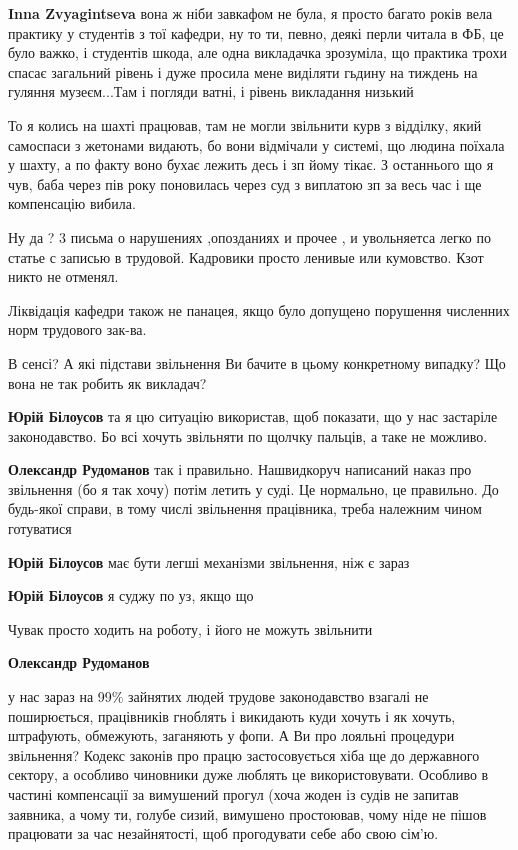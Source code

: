 \begin{itemize}
\begin{itemize} %
\textbf{Inna Zvyagintseva} вона ж ніби завкафом не була, я просто багато років вела практику у студентів з тої кафедри, ну то ти, певно, деякі перли читала в ФБ, це було важко, і студентів шкода, але одна викладачка зрозуміла, що практика трохи спасає загальний рівень і дуже просила мене виділяти гьдину на тиждень на гуляння музеєм...Там і погляди ватні, і рівень викладання низький
\end{itemize} %

То я колись на шахті працював, там не могли звільнити курв з відділку, який самоспаси з жетонами видають, бо вони відмічали у системі, що людина поїхала у шахту, а по факту воно бухає лежить десь і зп йому тікає.
З останнього що я чув, баба через пів року поновилась через суд з виплатою зп за весь час і ще компенсацію вибила.

Ну да ? 3 письма о нарушениях ,опозданиях и прочее , и увольняетса легко по статье с записью в трудовой. Кадровики просто ленивые или кумовство. Кзот никто не отменял.

Ліквідація кафедри також не панацея, якщо було допущено порушення численних норм трудового зак-ва.

В сенсі? А які підстави звільнення Ви бачите в цьому конкретному випадку? Що вона не так робить як викладач?

\begin{itemize} %
\textbf{Юрій Білоусов} та я цю ситуацію використав, щоб показати, що у нас застаріле законодавство. Бо всі хочуть звільняти по щолчку пальців, а таке не можливо.

\textbf{Олександр Рудоманов} так і правильно. Нашвидкоруч написаний наказ про звільнення (бо я так хочу) потім летить у суді. Це нормально, це правильно. До будь-якої справи, в тому числі звільнення працівника, треба належним чином готуватися


\textbf{Юрій Білоусов} має бути легші механізми звільнення, ніж є зараз


\textbf{Юрій Білоусов} я суджу по уз, якщо що


Чувак просто ходить на роботу, і його не можуть звільнити

\textbf{Олександр Рудоманов} 

у нас зараз на 99\% зайнятих людей трудове законодавство взагалі не
поширюється, працівників гноблять і викидають куди хочуть і як хочуть,
штрафують, обмежують, заганяють у фопи. А Ви про лояльні процедури звільнення?
Кодекс законів про працю застосовується хіба ще до державного сектору, а
особливо чиновники дуже люблять це використовувати. Особливо в частині
компенсації за вимушений прогул (хоча жоден із судів не запитав заявника, а
чому ти, голубе сизий, вимушено простоював, чому ніде не пішов працювати за час
незайнятості, щоб прогодувати себе або свою сім'ю.


\end{itemize}
\end{itemize}
